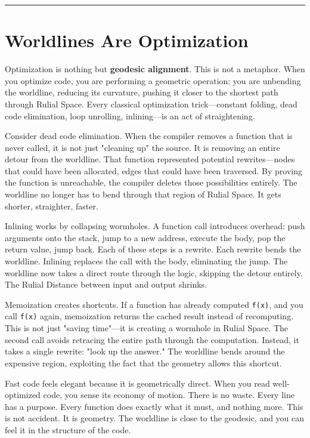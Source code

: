 \begin{center}
\rule{0.5\linewidth}{0.5pt}
\end{center}

\section{Worldlines Are Optimization}
\label{6.7-worldlines-are-optimization}

Optimization is nothing but \textbf{geodesic alignment}. This is not a metaphor. When you optimize
code, you are performing a geometric operation: you are unbending the worldline, reducing its
curvature, pushing it closer to the shortest path through Rulial Space. Every classical optimization
trick—constant folding, dead code elimination, loop unrolling, inlining—is an act of straightening.

Consider dead code elimination. When the compiler removes a function that is never called, it is not
just "cleaning up" the source. It is removing an entire detour from the worldline. That function
represented potential rewrites—nodes that could have been allocated, edges that could have been
traversed. By proving the function is unreachable, the compiler deletes those possibilities entirely.
The worldline no longer has to bend through that region of Rulial Space. It gets shorter, straighter,
faster.

Inlining works by collapsing wormholes. A function call introduces overhead: push arguments onto the
stack, jump to a new address, execute the body, pop the return value, jump back. Each of these steps
is a rewrite. Each rewrite bends the worldline. Inlining replaces the call with the body, eliminating
the jump. The worldline now takes a direct route through the logic, skipping the detour entirely. The
Rulial Distance between input and output shrinks.

Memoization creates shortcuts. If a function has already computed \texttt{f(x)}, and you call
\texttt{f(x)} again, memoization returns the cached result instead of recomputing. This is not just
"saving time"—it is creating a wormhole in Rulial Space. The second call avoids retracing the entire
path through the computation. Instead, it takes a single rewrite: "look up the answer." The worldline
bends around the expensive region, exploiting the fact that the geometry allows this shortcut.

Fast code feels elegant because it is geometrically direct. When you read well-optimized code, you
sense its economy of motion. There is no waste. Every line has a purpose. Every function does exactly
what it must, and nothing more. This is not accident. It is geometry. The worldline is close to the
geodesic, and you can feel it in the structure of the code.

